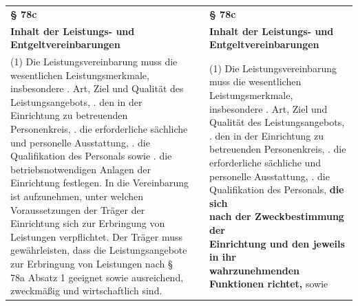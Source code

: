 \documentclass[10pt,a4paper,landscape]{article}
\begin{document}
\begin{longtable}{|L{8.2cm}|L{8.2cm}|L{8.2cm}|}
\hhline{|---|}
\textbf{\S{} 78c} &  & \textbf{\S{} 78c} \\
\hhline{|---|}
\textbf{Inhalt der Leistungs- und  \newline Entgeltvereinbarungen} &  & \textbf{Inhalt der Leistungs- und  \newline Entgeltvereinbarungen} \\
\hhline{|---|}
(1) Die Leistungsvereinbarung muss die  \newline wesentlichen Leistungsmerkmale,  \newline insbesondere   .   Art, Ziel und Qualität des  \newline Leistungsangebots,   . den in der Einrichtung zu betreuenden  \newline Personenkreis,   . die erforderliche sächliche und  \newline personelle Ausstattung,   . die Qualifikation des \textcolor{diffred}{Personals} sowie   . die betriebsnotwendigen Anlagen der  \newline Einrichtung   \newline festlegen. In die Vereinbarung ist  \newline aufzunehmen, unter welchen  \newline Voraussetzungen der Träger der  \newline Einrichtung sich zur Erbringung von  \newline Leistungen verpflichtet. Der Träger muss  \newline gewährleisten, dass die Leistungsangebote  \newline zur Erbringung von Leistungen nach \S{} 78a  \newline Absatz 1 geeignet sowie ausreichend,  \newline zweckmäßig und wirtschaftlich sind. &  & (1) Die Leistungsvereinbarung muss die  \newline wesentlichen Leistungsmerkmale,  \newline insbesondere   .   Art, Ziel und Qualität des  \newline Leistungsangebots,   . den in der Einrichtung zu betreuenden  \newline Personenkreis,   . die erforderliche sächliche und  \newline personelle Ausstattung,   . die Qualifikation des \textcolor{diffgreen}{Personals, }\textbf{\textcolor{diffgreen}{die sich  \newline nach der Zweckbestimmung der  \newline Einrichtung und den jeweils in ihr  \newline wahrzunehmenden Funktionen richtet,}}  \newline sowie   
\end{longtable}
\end{document}
